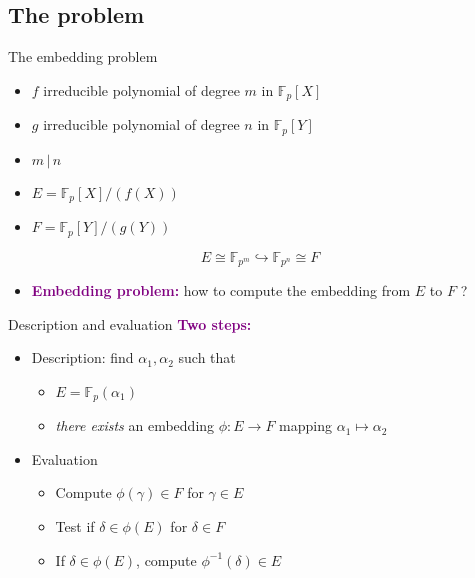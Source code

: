 \documentclass[xcolor=x11names,compress]{beamer}
\theoremstyle{break}
\theoremstyle{sc}
\theoremstyle{definition}
\theoremstyle{remark}
\begin{document}
\subsection{The problem}
\begin{frame}{The embedding problem}
  \begin{itemize}
    \item $f$ irreducible polynomial of degree $m$ in
      $\mathbb{F}_p[X]$
    \item $g$ irreducible polynomial of degree $n$ in $\mathbb{F}_p[Y]$
    \item $m\,|\,n$
    \item $E = \mathbb{F}_p[X]/(f(X))$
    \item $F = \mathbb{F}_p[Y]/(g(Y))$
  \end{itemize}
  \[
    E \cong \mathbb{F}_{p^m} \hookrightarrow \mathbb{F}_{p^n}\cong F
  \]
  \begin{itemize}
    \item \textcolor{purple}{\textbf{Embedding problem:}} how to compute the
      embedding from $E$ to $F$ ?
  \end{itemize}
\end{frame}
\begin{frame}{Description and evaluation}
  \textcolor{purple}{\textbf{Two steps:}}
  \begin{itemize}
    \item Description: find $\alpha_1, \alpha_2$ such that
      \begin{itemize}
        \item $E = \mathbb{F}_p(\alpha_1)$
        \item \emph{there exists} an embedding $\phi:E\to F$ mapping
          $\alpha_1\mapsto\alpha_2$
      \end{itemize}
    \item Evaluation
      \begin{itemize}
        \item Compute $\phi(\gamma)\in F$ for $\gamma\in E$
        \item Test if $\delta\in\phi(E)$ for $\delta\in F$
        \item If $\delta\in\phi(E)$, compute $\phi^{-1}(\delta)\in E$
      \end{itemize}
  \end{itemize}
\end{frame}
\end{document}
